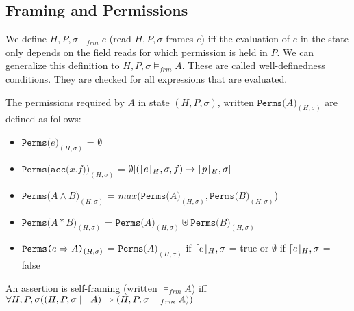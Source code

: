 \subsection{Framing and Permissions}
\begin{mytitle}[Framing] We define $H, P, \sigma \models_{frm} e$ (read $H, P, \sigma$ frames $e$) iff the evaluation of $e$ in the state only depends on the field reads for which permission is held in $P$. We can generalize this definition to $H, P, \sigma \models_{frm} A$. These are called well-definedness conditions. They are checked for all expressions that are evaluated.
\end{mytitle}
\begin{mytitle} The permissions required by $A$ in state $(H, P, \sigma)$, written $\texttt{Perms($A$)}_{(H, \sigma)}$ are defined as follows:
\begin{itemize}
    \item $\texttt{Perms($e$)}_{(H, \sigma)}$ = $\emptyset$
    \item $\texttt{Perms(acc($x$.$f$))}_{(H, \sigma)}$ = $\emptyset[(\lceil e\rfloor_H, \sigma, f) \to \lceil p\rfloor_H, \sigma]$
    \item $\texttt{Perms($A\land B$)}_{(H, \sigma)}$ = $max(\texttt{Perms($A$)}_{(H, \sigma)}, \texttt{Perms($B$)}_{(H, \sigma)}$)
    \item $\texttt{Perms($A*B$)}_{(H, \sigma)}$ = $\texttt{Perms($A$)}_{(H, \sigma)} \uplus \texttt{Perms($B$)}_{(H, \sigma)}$
    \item $\texttt{Perms($e \Rightarrow A$)}_{(H, \sigma)}$ = $\texttt{Perms($A$)}_{(H, \sigma)}$ if $\lceil e\rfloor_H,\sigma$ = true or $\emptyset$ if $\lceil e\rfloor_H,\sigma$ = false
\end{itemize}
\end{mytitle}
\begin{mytitle} An assertion is self-framing (written $\models_{frm} A$) iff $\forall H, P, \sigma((H, P, \sigma \models A) \Rightarrow (H, P, \sigma \models_{frm} A))$
\end{mytitle}

